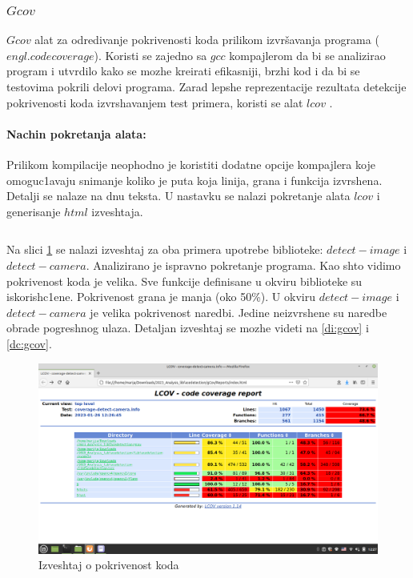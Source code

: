 \documentclass{article}
\begin{document}
\subsubsection{$Gcov$}
$Gcov$ alat za odredivanje pokrivenosti koda prilikom
izvršavanja programa ($engl. code coverage$). Koristi se zajedno sa $gcc$ kompajlerom
da bi se analizirao program i utvrdilo kako se mozhe kreirati efikasniji, brzhi kod i da bi
se testovima pokrili delovi programa.
Zarad lepshe reprezentacije rezultata detekcije pokrivenosti koda izvrshavanjem test primera,
koristi se alat $lcov$ \cite{VSskripta}.

\paragraph{Nachin pokretanja alata:}
Prilikom kompilacije neophodno je koristiti dodatne opcije kompajlera koje
omoguc1avaju snimanje koliko je puta koja linija, grana i funkcija izvrshena. Detalji se nalaze na dnu teksta. U nastavku se nalazi pokretanje alata $lcov$ i generisanje $html$ izveshtaja.
\selectfont

\inputminted[firstline=5]{shell-session}{run_gcov.sh}

\selectfont
Na slici \ref{covd:gcov} se nalazi izveshtaj za oba primera upotrebe biblioteke: $detect-image$ i $detect-camera.$ Analizirano je ispravno pokretanje programa. Kao shto vidimo pokrivenost koda je velika. Sve funkcije definisane u okviru biblioteke su iskorish\-c1ene. Pokrivenost grana je manja (oko 50\%). U okviru $detect-image$ i $detect-camera$ je velika pokrivenost naredbi. Jedine neizvrshene su naredbe obrade pogreshnog ulaza. Detaljan izveshtaj se mozhe videti na \ref{di:gcov} i \ref{dc:gcov}.
\begin{figure}[H]
    \centering
    \includegraphics[width=12cm]{img/gcov/gcovCoverageDetect.png}
    \caption{Izveshtaj o pokrivenost koda}
    \label{covd:gcov}
\end{figure}
\end{document}
